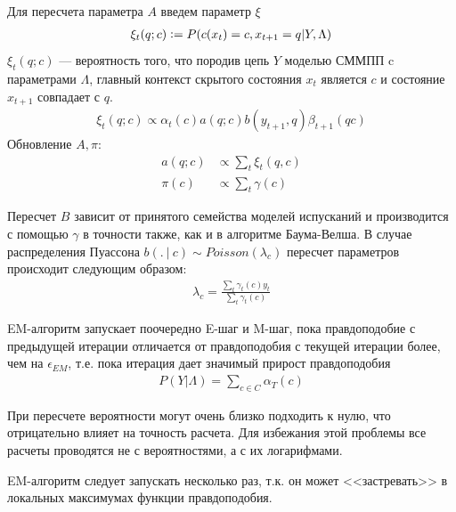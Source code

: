 \documentclass{matmex-diploma-custom}
\begin{document}
\begin{enumerate}
Для пересчета параметра $A$ введем параметр $\xi$
\begin{align*}
\xi_{t}(q;c) \mathrel{\mathop:}= P(c(x_{t})=c, x_{t+1} = q| Y, \Lambda)
\end{align*}
$\xi_{t}(q;c)$ --- вероятность того, что породив цепь $Y$ моделью СММПП c параметрами $\Lambda$, 
главный контекст скрытого состояния $ x_{t} $ является $c$ и состояние $ x_{t+1} $ совпадает с $q$.
\begin{align}
\xi_{t}(q;c) \propto {\alpha_{t}(c)a(q;c)b(y_{t+1},q)\beta_{t+1}(qc)} 
\label{formula:xi}
\end{align}
Обновление $ A , \pi$:
\begin{align}
a(q; c) &\propto \sum_{t}{\xi_{t}(q,c)} 
\label{formula:a}
\\\pi(c) &\propto \sum_{t}{\gamma(c)}
\end{align}

Пересчет $ B $ зависит от принятого семейства моделей испусканий и производится с помощью $ \gamma $ в точности также, как и в алгоритме Баума-Велша.
В случае распределения Пуассона
$b(.~|~c) \sim \textit{Poisson}(\lambda_{c})$ 
пересчет параметров происходит следующим образом:
\begin{align}
\lambda_{c} = \frac{\sum_{t}{\gamma_{t}(c)y_{t}}}{\sum_{t}{\gamma_{t}(c)}}
\end{align}
\end{enumerate}
EM-алгоритм запускает поочередно E-шаг и M-шаг, пока правдоподобие с предыдущей итерации отличается от правдоподобия с текущей итерации более, чем на $ \epsilon_{\textit{EM}}$, т.е. пока итерация дает значимый прирост правдоподобия
\begin{align}
P(Y| \Lambda) = \sum_{c \in C}\alpha_{T}(c)
\end{align}

\begin{remark} При пересчете вероятности могут очень близко подходить к нулю, что отрицательно влияет на точность расчета. Для избежания этой проблемы все расчеты проводятся не с вероятностями, а с их логарифмами.
\end{remark}

\begin{remark} EM-алгоритм следует запускать несколько раз, т.к. он может <<застревать>> в локальных максимумах функции правдоподобия.
\end{remark}
\end{document}

